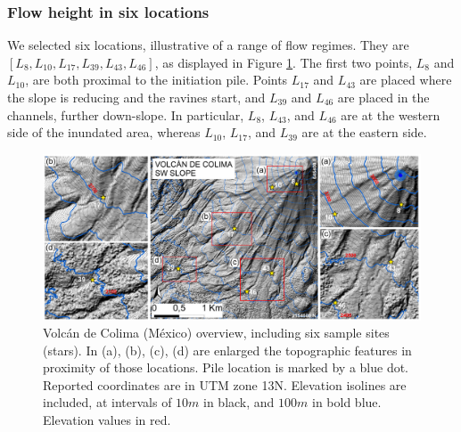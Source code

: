 \documentclass{article}
\begin{document}
\subsubsection{Flow height in six locations}\label{Obs2}
We selected six locations, illustrative of a range of flow regimes. They are $[L_8, L_{10}, L_{17}, L_{39}, L_{43}, L_{46}]$, as displayed in Figure \ref{fig:Colima-extra}. The first two points, $L_8$ and $L_{10}$, are both proximal to the initiation pile. Points $L_{17}$ and $L_{43}$ are placed where the slope is reducing and the ravines start, and $L_{39}$ and $L_{46}$ are placed in the channels, further down-slope. In particular, $L_8$, $L_{43}$, and $L_{46}$ are at the western side of the inundated area, whereas $L_{10}$, $L_{17}$, and $L_{39}$ are at the eastern side.
\begin{figure}[H]
         \centering
        \includegraphics[width=1\textwidth]{BAF_VolcanDeColima/FigExtra.jpg}
        \caption{Volc{\'a}n de Colima (M{\'e}xico) overview, including six sample sites (stars). In (a), (b), (c), (d) are enlarged the topographic features in proximity of those locations. Pile location is marked by a blue dot. Reported coordinates are in UTM zone 13N. Elevation isolines are included, at intervals of $10 m$ in black, and $100m$ in bold blue. Elevation values in red.}
        \label{fig:Colima-extra}
\end{figure}
\end{document}
